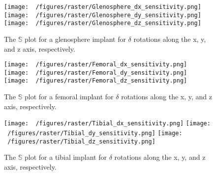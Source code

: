 \begin{figure}[h!]
	\centering
	\texttt{[image: ~/figures/raster/Glenosphere\_dx\_sensitivity.png]}
	\texttt{[image: ~/figures/raster/Glenosphere\_dy\_sensitivity.png]}
	\texttt{[image: ~/figures/raster/Glenosphere\_dz\_sensitivity.png]}
	\caption{The $\mathbb{S}$ plot for a glenosphere implant for $\delta$ rotations along the x, y, and z axis, respectively.}
	\label{fig:sca_sensitivity_plot}
\end{figure}
\begin{figure}[h!]
	\centering
	\texttt{[image: ~/figures/raster/Femoral\_dx\_sensitivity.png]}
	\texttt{[image: ~/figures/raster/Femoral\_dy\_sensitivity.png]}
	\texttt{[image: ~/figures/raster/Femoral\_dz\_sensitivity.png]}
	\caption{The $\mathbb{S}$ plot for a femoral implant for $\delta$ rotations along the x, y, and z axis, respectively.}
	\label{fig:fem_sensitivity_plot}
\end{figure}
\begin{figure}[h!]
	\centering
	\texttt{[image: ~/figures/raster/Tibial\_dx\_sensitivity.png]}
	\texttt{[image: ~/figures/raster/Tibial\_dy\_sensitivity.png]}
	\texttt{[image: ~/figures/raster/Tibial\_dz\_sensitivity.png]}
	\caption{The $\mathbb{S}$ plot for a tibial implant for $\delta$ rotations along the x, y, and z axis, respectively.}
	\label{fig:tib_sensitivity_plot}
\end{figure}


